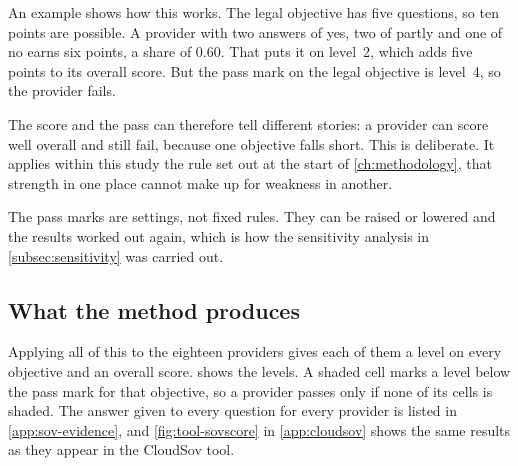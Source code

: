 An example shows how this works. The legal objective has five questions, so ten
points are possible. A provider with two answers of yes, two of partly and one of no
earns six points, a share of 0.60. That puts it on level~2, which adds five points to
its overall score. But the pass mark on the legal objective is level~4, so the
provider fails.

The score and the pass can therefore tell different stories: a provider can score
well overall and still fail, because one objective falls short. This is
deliberate. It applies within this study the rule set out at the start of
\cref{ch:methodology}, that strength in one place cannot make up for weakness in
another.

The pass marks are settings, not fixed rules. They can be raised or lowered and the
results worked out again, which is how the sensitivity analysis in
\cref{subsec:sensitivity} was carried out.

\subsection*{What the method produces}

Applying all of this to the eighteen providers gives each of them a level on every
objective and an overall score.  shows the levels. A shaded cell
marks a level below the pass mark for that objective, so a provider passes only if
none of its cells is shaded. The answer given to every question for every
provider is listed in \cref{app:sov-evidence}, and \cref{fig:tool-sovscore} in
\cref{app:cloudsov} shows the same results as they appear in the CloudSov tool.

